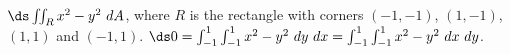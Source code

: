 {$\ds \iint_R x^2-y^2\ dA$, where $R$ is the rectangle with corners $(-1,-1)$, $(1,-1)$, $(1,1)$ and $(-1,1)$.
}
{$\ds 0 = \int_{-1}^1\int_{-1}^{1}x^2-y^2\ dy\ dx = \int_{-1}^1\int_{-1}^{1}x^2-y^2\ dx\ dy$.
}